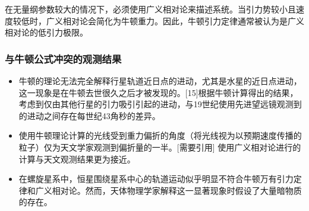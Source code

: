 在无量纲参数较大的情况下，必须使用广义相对论来描述系统。当引力势较小且速度较低时，广义相对论会简化为牛顿重力。因此，牛顿引力定律通常被认为是广义相对论的低引力极限。
\subsubsection{与牛顿公式冲突的观测结果}
\begin{itemize}
\item 牛顿的理论无法完全解释行星轨道近日点的进动，尤其是水星的近日点进动，这一现象是在牛顿去世很久之后才被发现的。[15]根据牛顿计算得出的结果，考虑到仅由其他行星的引力吸引引起的进动，与19世纪使用先进望远镜观测到的进动之间存在每世纪43角秒的差异。
\item 使用牛顿理论计算的光线受到重力偏折的角度（将光线视为以预期速度传播的粒子）仅为天文学家观测到偏折量的一半。[需要引用] 使用广义相对论进行的计算与天文观测结果更为接近。
\item 在螺旋星系中，恒星围绕星系中心的轨道运动似乎明显不符合牛顿万有引力定律和广义相对论。然而，天体物理学家解释这一显著现象时假设了大量暗物质的存在。
\end{itemize}
